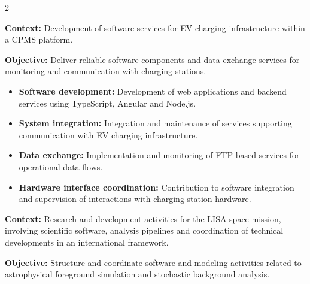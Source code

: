 \documentclass[8pt,a4paper,ragged2e,withhyper]{altacv}
\begin{document}
\begin{paracol}{2}


\textbf{Context:} Development of software services for EV charging infrastructure within a CPMS platform.

\textbf{Objective:} Deliver reliable software components and data exchange services for monitoring and communication with charging stations.

\begin{itemize}
\item \textbf{Software development:} Development of web applications and backend services using TypeScript, Angular and Node.js.
\item \textbf{System integration:} Integration and maintenance of services supporting communication with EV charging infrastructure.
\item \textbf{Data exchange:} Implementation and monitoring of FTP-based services for operational data flows.
\item \textbf{Hardware interface coordination:} Contribution to software integration and supervision of interactions with charging station hardware.
\end{itemize}

\divider


\textbf{Context:} Research and development activities for the LISA space mission, involving scientific software, analysis pipelines and coordination of technical developments in an international framework.

\textbf{Objective:} Structure and coordinate software and modeling activities related to astrophysical foreground simulation and stochastic background analysis.


\end{paracol}
\end{document}
